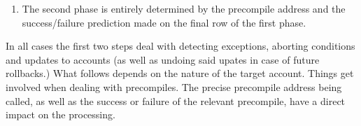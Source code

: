 \begin{itemize}
\begin{enumerate}
				This first phase culminates with a (second) scenario-row where we set, for some positive (scenario-dependent) row offset $\exampleOffset$,
				\[
					\left\{ \begin{array}{lcl}
						\peekScenario_{i + \exampleOffset}        & = & 1 \\
						\scenSomePrecompile _{i + \exampleOffset} & = & 1 \\
						\multicolumn{3}{l}{\!\!\!\! \left. \begin{array}{lcl}
							\scenPrcSuccessWillRevert _{i + \exampleOffset} & = & \varepsilon    \\
							\scenPrcSuccessWontRevert _{i + \exampleOffset} & = & \varepsilon'   \\
							\scenPrcFailureKnownToHub _{i + \exampleOffset} & = & \varepsilon''  \\
							\scenPrcFailureKnownToRam _{i + \exampleOffset} & = & \varepsilon''' \\
						\end{array} \right \} \text{ precisely one is set to $1$.}}
					\end{array} \right.
				\]
			\item
				The second phase is entirely determined by the precompile address and the success/failure prediction made on the final row of the first phase.
		\end{enumerate}
\end{itemize}
In all cases the first two steps deal with detecting exceptions, aborting conditions and updates to accounts (as well as undoing said upates in case of future rollbacks.)
What follows depends on the nature of the target account.
Things get involved when dealing with precompiles.
The precise precompile address being called, as well as the success or failure of the relevant precompile, have a direct impact on the processing.
